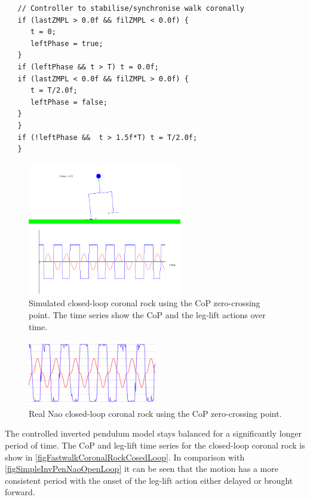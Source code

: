 \documentclass[pdftex,11pt,a4paper]{report}
\begin{document}
\begin{lstlisting}  
   // Controller to stabilise/synchronise walk coronally
   if (lastZMPL > 0.0f && filZMPL < 0.0f) {
      t = 0;
      leftPhase = true;
   }
   if (leftPhase && t > T) t = 0.0f;
   if (lastZMPL < 0.0f && filZMPL > 0.0f) {
      t = T/2.0f;
      leftPhase = false;
   }
   }
   if (!leftPhase &&  t > 1.5f*T) t = T/2.0f;
   }
\end{lstlisting}  

\begin{figure}[ht]
\centering
\includegraphics[width=0.6\textwidth]{figures/FastwalkCoronalRockCosedLoop}
\caption{Simulated closed-loop coronal rock using the CoP zero-crossing point. The time series show the CoP and the leg-lift actions over time.} \label{figFastwalkCoronalRockCosedLoop}
\end{figure}

\begin{figure}[ht]
\centering
\includegraphics[width=0.5\textwidth]{figures/FastwalkRealCoPLift}
\caption{Real Nao closed-loop coronal rock using the CoP zero-crossing point.} \label{figFastwalkRealCoPLift}
\end{figure} 

The controlled inverted pendulum model stays balanced for a significantly longer period of time. The CoP and leg-lift time series for the closed-loop coronal rock is show in \autoref{figFastwalkCoronalRockCosedLoop}. In comparison with \autoref{figSimpleInvPenNaoOpenLoop} it can be seen that the motion has a more consistent period with the onset of the leg-lift action either delayed or brought forward. 
\end{document}
